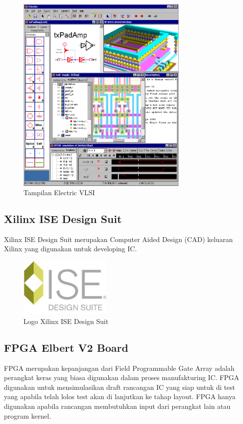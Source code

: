 \begin{figure}
	\centering
	\includegraphics[width=0.75\textwidth]
	{pics/electricvlsi.png}
	\caption{Tampilan Electric VLSI}
	\label{fig:vlsi}
\end{figure}

\subsection{Xilinx ISE Design Suit}
Xilinx ISE Design Suit merupakan Computer Aided Design (CAD) keluaran Xilinx yang digunakan untuk developing IC.

\begin{figure}
	\centering
	\includegraphics[width=0.4\textwidth]
	{pics/ise-logo.jpg}
	\caption{Logo Xilinx ISE Design Suit}
	\label{ise}
\end{figure}

\subsection{FPGA Elbert V2 Board}
FPGA merupakan kepanjangan dari Field Programmable Gate Array adalah perangkat keras yang biasa digunakan dalam proses manufakturing IC. FPGA digunakan untuk mensimulasikan draft rancangan IC yang siap untuk di test yang apabila telah lolos test akan di lanjutkan ke tahap layout. FPGA hanya digunakan apabila rancangan membutuhkan input dari perangkat lain atau program kernel.

